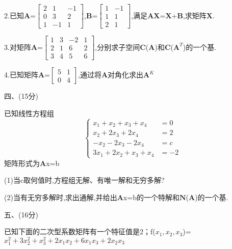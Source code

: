 \documentclass[a4paper]{article} %
\begin{document}
\vspace{20em}%

2.已知\(\mathbf{A}\)=$\begin{bmatrix}2&1&-1\\0&3&2\\1&-1&1\end{bmatrix}$,\(\mathbf{B}\)=$\begin{bmatrix}1&-1\\1&1\\2&1\end{bmatrix}$,满足\(\mathbf{A}\)\(\mathbf{X}\)=\(\mathbf{X}\)+\(\mathbf{B}\),求矩阵\(\mathbf{X}\).

\clearpage

3.对矩阵\(\mathbf{A}\)=$\begin{bmatrix}1&3&-2&1\\2&1&6&2\\3&4&5&6\end{bmatrix}$,分别求子空间\(\mathbf{C}\)(\(\mathbf{A}\))和\(\mathbf{C}\)(\(\mathbf{A}^T\))的一个基.

\vspace{25em}

4.已知矩阵\(\mathbf{A}\)=$\begin{bmatrix}5&1\\0&4\end{bmatrix}$,通过将\(\mathbf{A}\)对角化求出\(\mathbf{A}^K\)

\clearpage

四、(15分)

已知线性方程组
\begin{equation*}
    \left\{\begin{aligned}
        x_{1}+x_{2}+x_{3}+x_{4}&=0\\
        x_{2}+2x_{3}+2x_{4}&=2\\
        -x_{2}-2x_{3}-2x_{4}&=c\\
        3x_{1}+2x_{2}+x_{3}+x_{4}&=-2
    \end{aligned}\right.%
\end{equation*}矩阵形式为\(\mathbf{A}\)x=b

(1)当c取何值时,方程组无解、有唯一解和无穷多解?

(2)当有无穷多解时,求出通解,并给出\(\mathbf{A}\)x=b的一个特解和\(\mathbf{N}\)(\(\mathbf{A}\))的一个基.

\vspace{19em}

五、(16分)

已知下面的二次型系数矩阵有一个特征值是2；f(\(x_1,x_2,x_3\))=\(x_1^2+3x_2^2+x_3^2+2x_1x_2+6x_1x_3+2x_2x_3\)
\end{document}
